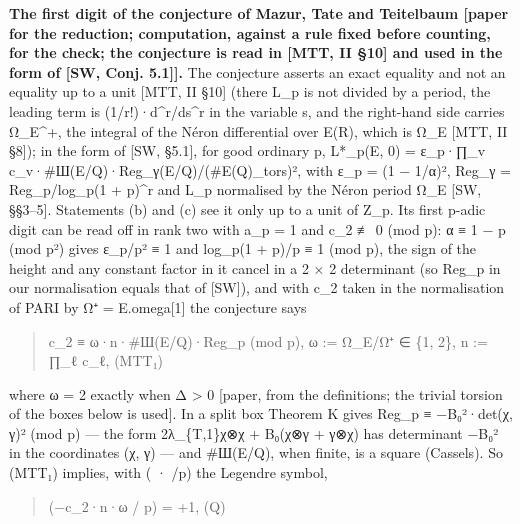 \documentclass[11pt,a4paper]{article}
\theoremstyle{named}
\begin{document}
\textbf{The first digit of the conjecture of Mazur, Tate and Teitelbaum [paper for the reduction; computation, against a rule fixed before counting, for the check; the conjecture is read in [MTT, II §10] and used in the form of [SW, Conj. 5.1]].} The conjecture asserts an exact equality and not an equality up to a unit [MTT, II §10] (there L\_p is not divided by a period, the leading term is (1/r!)·d\textasciicircum{}r/ds\textasciicircum{}r in the variable s, and the right-hand side carries Ω\_E\textasciicircum{}+, the integral of the Néron differential over E(R), which is Ω\_E [MTT, II §8]); in the form of [SW, §5.1], for good ordinary p, L*\_p(E, 0) = ε\_p·∏\_v c\_v·\#Ш(E/Q)·Reg\_γ(E/Q)/(\#E(Q)\_tors)², with ε\_p = (1 − 1/α)², Reg\_γ = Reg\_p/log\_p(1 + p)\textasciicircum{}r and L\_p normalised by the Néron period Ω\_E [SW, §§3–5]. Statements (b) and (c) see it only up to a unit of Z\_p. Its first p-adic digit can be read off in rank two with a\_p = 1 and c\_2 ≢ 0 (mod p): α ≡ 1 − p (mod p²) gives ε\_p/p² ≡ 1 and log\_p(1 + p)/p ≡ 1 (mod p), the sign of the height and any constant factor in it cancel in a 2 × 2 determinant (so Reg\_p in our normalisation equals that of [SW]), and with c\_2 taken in the normalisation of PARI by Ω⁺ = E.omega[1] the conjecture says

\begin{quote}
c\_2 ≡ ω·n·\#Ш(E/Q)·Reg\_p (mod p),  ω := Ω\_E/Ω⁺ ∈ \{1, 2\},  n := ∏\_ℓ c\_ℓ,   (MTT₁)
\end{quote}

where ω = 2 exactly when Δ \textgreater{} 0 [paper, from the definitions; the trivial torsion of the boxes below is used]. In a split box Theorem K gives Reg\_p ≡ −B₀²·det(χ, γ)² (mod p) — the form 2λ\_\{T,1\}χ⊗χ + B₀(χ⊗γ + γ⊗χ) has determinant −B₀² in the coordinates (χ, γ) — and \#Ш(E/Q), when finite, is a square (Cassels). So (MTT₁) implies, with ( · /p) the Legendre symbol,

\begin{quote}
(−c\_2·n·ω / p) = +1,   (Q)
\end{quote}
\end{document}
